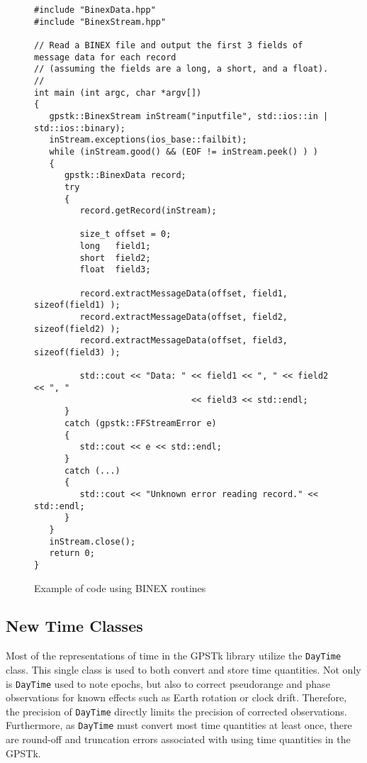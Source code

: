 \documentclass{ion-gps}
\newcommand{\gpstkclass}[1]{\texttt{#1}}
\begin{document}
\begin{figure*}[htbp]
\begin{small}
\begin{bf}
\begin{lstlisting}
#include "BinexData.hpp"
#include "BinexStream.hpp"

// Read a BINEX file and output the first 3 fields of message data for each record
// (assuming the fields are a long, a short, and a float).
//
int main (int argc, char *argv[])
{
   gpstk::BinexStream inStream("inputfile", std::ios::in | std::ios::binary);   
   inStream.exceptions(ios_base::failbit);
   while (inStream.good() && (EOF != inStream.peek() ) )
   {
      gpstk::BinexData record;
      try
      {
         record.getRecord(inStream);

         size_t offset = 0;
         long   field1;
         short  field2;
         float  field3;

         record.extractMessageData(offset, field1, sizeof(field1) );
         record.extractMessageData(offset, field2, sizeof(field2) );
         record.extractMessageData(offset, field3, sizeof(field3) );

         std::cout << "Data: " << field1 << ", " << field2 << ", "
                               << field3 << std::endl;
      }
      catch (gpstk::FFStreamError e)
      {
         std::cout << e << std::endl;
      }
      catch (...)
      {
         std::cout << "Unknown error reading record." << std::endl;
      }
   }
   inStream.close();
   return 0;
}

\end{lstlisting}
\end{bf}
\end{small}
\caption{Example of code using BINEX routines}
\label{fig:binexclientcode}
\end{figure*}

\subsection*{New Time Classes}
Most of the representations of time in the GPSTk library utilize the
\gpstkclass{DayTime} class. This single class is used to both convert
and store time quantities. Not only is \gpstkclass{DayTime} used to
note epochs, but also to correct pseudorange and phase observations for
known effects such as Earth rotation or clock drift. Therefore,
the precision of \gpstkclass{DayTime} directly limits the precision of corrected
observations. Furthermore, as \gpstkclass{DayTime} must convert most
time quantities at least once, there are round-off and truncation
errors associated with using time quantities in the GPSTk.
\end{document}
